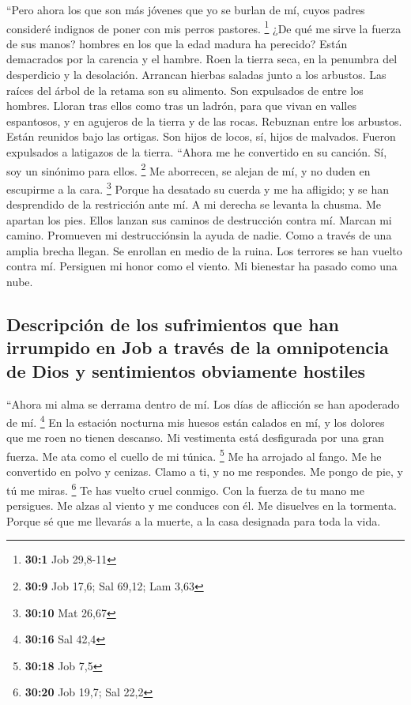  ``Pero ahora los que son más jóvenes que yo se burlan de
mí, cuyos padres consideré indignos de poner con mis perros pastores.
\footnote{\textbf{30:1} Job 29,8-11}  ¿De qué me sirve la
fuerza de sus manos? hombres en los que la edad madura ha perecido?
 Están demacrados por la carencia y el hambre. Roen la
tierra seca, en la penumbra del desperdicio y la desolación.
 Arrancan hierbas saladas junto a los arbustos. Las raíces
del árbol de la retama son su alimento.  Son expulsados de
entre los hombres. Lloran tras ellos como tras un ladrón, 
para que vivan en valles espantosos, y en agujeros de la tierra y de las
rocas.  Rebuznan entre los arbustos. Están reunidos bajo
las ortigas.  Son hijos de locos, sí, hijos de malvados.
Fueron expulsados a latigazos de la tierra.  ``Ahora me he
convertido en su canción. Sí, soy un sinónimo para ellos. \footnote{\textbf{30:9}
  Job 17,6; Sal 69,12; Lam 3,63}  Me aborrecen, se alejan
de mí, y no duden en escupirme a la cara. \footnote{\textbf{30:10} Mat
  26,67}  Porque ha desatado su cuerda y me ha afligido;
y se han desprendido de la restricción ante mí.  A mi
derecha se levanta la chusma. Me apartan los pies. Ellos lanzan sus
caminos de destrucción contra mí.  Marcan mi camino.
Promueven mi destrucciónsin la ayuda de nadie.  Como a
través de una amplia brecha llegan. Se enrollan en medio de la ruina.
 Los terrores se han vuelto contra mí. Persiguen mi honor
como el viento. Mi bienestar ha pasado como una nube.

\hypertarget{descripciuxf3n-de-los-sufrimientos-que-han-irrumpido-en-job-a-travuxe9s-de-la-omnipotencia-de-dios-y-sentimientos-obviamente-hostiles}{%
\subsection{Descripción de los sufrimientos que han irrumpido en Job a
través de la omnipotencia de Dios y sentimientos obviamente
hostiles}\label{descripciuxf3n-de-los-sufrimientos-que-han-irrumpido-en-job-a-travuxe9s-de-la-omnipotencia-de-dios-y-sentimientos-obviamente-hostiles}}

 ``Ahora mi alma se derrama dentro de mí. Los días de
aflicción se han apoderado de mí. \footnote{\textbf{30:16} Sal 42,4}
 En la estación nocturna mis huesos están calados en mí,
y los dolores que me roen no tienen descanso.  Mi
vestimenta está desfigurada por una gran fuerza. Me ata como el cuello
de mi túnica. \footnote{\textbf{30:18} Job 7,5}  Me ha
arrojado al fango. Me he convertido en polvo y cenizas. 
Clamo a ti, y no me respondes. Me pongo de pie, y tú me miras.
\footnote{\textbf{30:20} Job 19,7; Sal 22,2}  Te has
vuelto cruel conmigo. Con la fuerza de tu mano me persigues.
 Me alzas al viento y me conduces con él. Me disuelves en
la tormenta.  Porque sé que me llevarás a la muerte, a la
casa designada para toda la vida.

